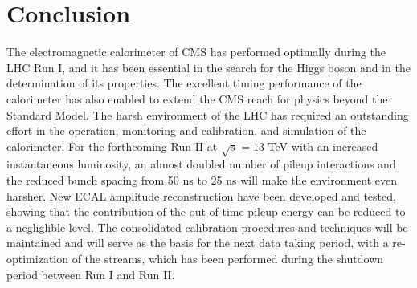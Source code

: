 \documentclass[journal]{IEEEtran}
\begin{document}
\section{Conclusion}
\label{sec:conclusions}
The electromagnetic calorimeter of CMS has performed optimally during the LHC Run I, and it has been essential in the search for the Higgs boson and in the determination of its properties. The excellent timing performance of the calorimeter has also enabled to extend the CMS reach for physics beyond the Standard Model. The harsh environment of the LHC has required an outstanding effort in the operation, monitoring and calibration, and simulation of the calorimeter. For the forthcoming Run II at $\sqrt{s}=13$ TeV with an increased instantaneous luminosity, an almost doubled number of pileup interactions and the reduced bunch spacing from 50 ns to 25 ns will make the environment even harsher. New ECAL amplitude reconstruction have been developed and tested, showing that the contribution of the out-of-time pileup energy can be reduced to a negliglible level. 
The consolidated calibration procedures and techniques will be maintained and will serve as the basis for the next data taking period, with a re-optimization of the streams, which has been performed during the shutdown period between Run I and Run II.


\ifCLASSOPTIONcaptionsoff
  \newpage
\fi
\end{document}
